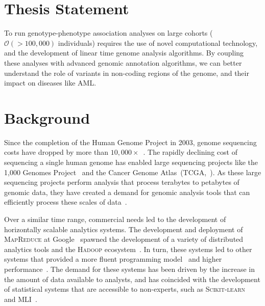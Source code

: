 \documentclass[11pt]{article} %
\begin{document}
\section{Thesis Statement}

To run genotype-phenotype association analyses on large cohorts ($\mathcal{O}(>100,000)$
individuals) requires the use of novel computational technology, and the development of
linear time genome analysis algorithms. By coupling these analyses with advanced genomic
annotation algorithms, we can better understand the role of variants in non-coding regions
of the genome, and their impact on diseases like AML.

\section{Background}

Since the completion of the Human Genome Project in 2003, genome sequencing costs have dropped
by more than $10,000\times$~\cite{nhgri}. The rapidly declining cost of sequencing a single human
genome has enabled large sequencing projects like the 1,000 Genomes Project~\cite{siva08} and
the Cancer Genome Atlas~(TCGA,~\cite{weinstein13}). As these large sequencing projects perform
analysis that process terabytes to petabytes of genomic data, they have created a demand
for genomic analysis tools that can efficiently process these scales of data~\cite{schadt10, stein10}.

Over a similar time range, commercial needs led to the development of horizontally scalable analytics
systems. The development and deployment of \textsc{MapReduce} at Google~\cite{dean04, dean08} spawned
the development of a variety of distributed analytics tools and the \textsc{Hadoop} ecosystem~\cite{hadoop}.
In turn, these systems led to other systems that provided a more fluent programming
model~\cite{yu08} and higher performance~\cite{zaharia10}. The demand for these systems has
been driven by the increase in the amount of data available to analysts, and has coincided with the
development of statistical systems that are accessible to non-experts, such as
\textsc{Scikit-learn}~\cite{pedregosa11} and \textsc{MLI}~\cite{sparks13}.
\end{document}
